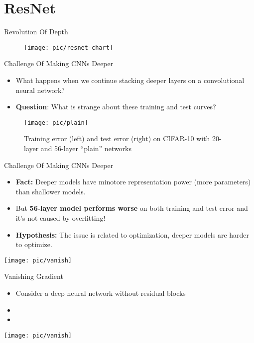 \documentclass[serif, aspectratio=169]{beamer}
\begin{document}
\section{ResNet}

\begin{frame}{Revolution Of Depth}
	\begin{figure}[htpb]
		\begin{center}
			\texttt{[image: pic/resnet-chart]}
		\end{center}
	\end{figure}
\end{frame}

\begin{frame}{Challenge Of Making CNNs Deeper}
	\begin{itemize}
		\item What happens when we continue stacking deeper layers on a convolutional neural network?
		\item \textbf{Question}: What is strange about these training and test curves?
	\end{itemize}
	\begin{figure}[htpb]
		\begin{center}
			\texttt{[image: pic/plain]}
			\captionsetup{justification=centering}
			\caption*{\scriptsize{Training error (left) and test error (right) on CIFAR-10 with 20-layer and 56-layer “plain” networks}}
		\end{center}
	\end{figure}
\end{frame}

\begin{frame}{Challenge Of Making CNNs Deeper}
	\begin{itemize}
		\item \textbf{Fact:} Deeper models have minotore representation power (more parameters) than shallower models.
		\item But \textbf{56-layer model performs worse} on both training and test error and it's not caused by overfitting!
		\item \textbf{Hypothesis:} The issue is related to optimization, deeper models are harder to optimize.	
	\end{itemize}
	\vspace{-0.5cm}
	\centering
	\texttt{[image: pic/vanish]}
\end{frame}


\begin{frame}{Vanishing Gradient}
	\begin{itemize}
		\item Consider a deep neural network without residual blocks
		\item 
		\item 
	\end{itemize}
	\vspace{-0.5cm}
	\centering
	\texttt{[image: pic/vanish]}
\end{frame}
\end{document}
